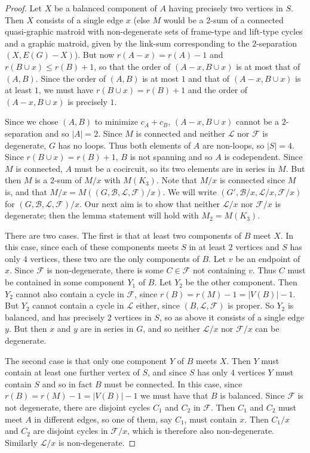 \documentclass[12pt]{article}
\theoremstyle{definition}
\theoremstyle{plain} %
\newcommand{\cB}{\mathcal{B}}
\newcommand{\cF}{\mathcal{F}}
\newcommand{\cL}{\mathcal{L}}
\begin{document}
\begin{proof}
Let $X$ be a balanced component of $A$ having precisely two vertices in $S$. Then $X$ consists of a single edge $x$ (else $M$ would be a $2$-sum of a connected quasi-graphic matroid with non-degenerate sets of frame-type and lift-type cycles and a graphic matroid, given by the link-sum corresponding to the $2$-separation $(X, E(G) - X)$). But now $r(A - x) = r(A) - 1$ and $r(B \cup x) \le r(B) + 1$, so that the order of $(A - x, B \cup x)$ is at most that of $(A,B)$. Since the order of $(A,B)$ is at most $1$ and that of $(A - x, B \cup x)$ is at least $1$, we must have $r(B \cup x) = r(B) + 1$ and the order of $(A - x, B \cup x)$ is precisely $1$.

Since we chose $(A,B)$ to minimize $c_A + c_B$, $(A - x, B \cup x)$ cannot be a $2$-separation and so $|A| = 2$. Since $M$ is connected and neither $\mathcal{L}$ nor $\mathcal{F}$ is degenerate, $G$ has no loops. Thus both elements of $A$ are non-loops, so $|S| = 4$. Since $r(B \cup x) = r(B) + 1$, $B$ is not spanning and so $A$ is codependent. Since $M$ is connected, $A$ must be a cocircuit, so its two elements are in series in $M$. But then $M$ is a $2$-sum of $M/x$ with $M(K_3)$. Note that $M/x$ is connected since $M$ is, and that $M/x = M((G,\cB,\mathcal{L},\mathcal{F})/x)$. 
We will write $(G', \cB/x, \cL/x, \cF/x)$ for $(G, \cB, \cL, \cF)/x$.
Our next aim is to show that neither $\mathcal{L}/x$ nor $\mathcal{F}/x$ is degenerate; then the lemma statement will hold with $M_2 = M(K_3)$.

There are two cases. The first is that at least two components of $B$ meet $X$. In this case, since each of these components meets $S$ in at least $2$ vertices and $S$ has only $4$ vertices, these two are the only components of $B$. Let $v$ be an endpoint of $x$. Since $\mathcal{F}$ is non-degenerate, there is some $C \in \mathcal{F}$ not containing $v$. Thus $C$ must be contained in some component $Y_1$ of $B$. Let $Y_2$ be the other component. Then $Y_2$ cannot also contain a cycle in $\mathcal{F}$, since $r(B) = r(M) - 1 = |V(B)| - 1$. But $Y_2$ cannot contain a cycle in $\mathcal{L}$ either, since $(B,\mathcal{L},\mathcal{F})$ is proper. So $Y_2$ is balanced, and has precisely $2$ vertices in $S$, so as above it consists of a single edge $y$. But then $x$ and $y$ are in series in $G$, and so neither $\mathcal{L}/x$ nor $\mathcal{F}/x$ can be degenerate.

The second case is that only one component $Y$ of $B$ meets $X$. Then $Y$ must contain at least one further vertex of $S$, and since $S$ has only $4$ vertices $Y$ must contain $S$ and so in fact $B$ must be connected. In this case, since $r(B) = r(M) - 1 = |V(B)| - 1$ we must have that $B$ is balanced. Since $\mathcal{F}$ is not degenerate, there are disjoint cycles $C_1$ and $C_2$ in $\mathcal{F}$. Then $C_1$ and $C_2$ must meet $A$ in different edges, so one of them, say $C_1$, must contain $x$. Then $C_1/x$ and $C_2$ are disjoint cycles in $\mathcal{F}/x$, which is therefore also non-degenerate. Similarly $\mathcal{L}/x$ is non-degenerate.
\end{proof}
\end{document}
